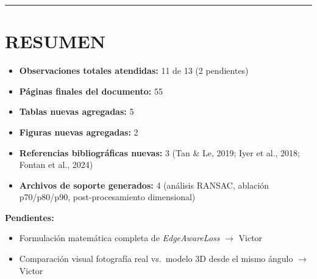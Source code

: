 \documentclass[12pt, a4paper]{article}
\begin{document}
\vspace{1em}
\hrule
\vspace{1em}


\section*{RESUMEN}

\begin{itemize}[leftmargin=*, itemsep=0.5em]
\item \textbf{Observaciones totales atendidas:} 11 de 13 (2 pendientes)
\item \textbf{Páginas finales del documento:} 55
\item \textbf{Tablas nuevas agregadas:} 5
\item \textbf{Figuras nuevas agregadas:} 2
\item \textbf{Referencias bibliográficas nuevas:} 3 (Tan \& Le, 2019; Iyer et al., 2018; Fontan et al., 2024)
\item \textbf{Archivos de soporte generados:} 4 (análisis RANSAC, ablación p70/p80/p90, post-procesamiento dimensional)
\end{itemize}

\vspace{1em}
\begin{center}
\textbf{Pendientes:}
\end{center}
\begin{itemize}[leftmargin=*, itemsep=0.5em]
\item Formulación matemática completa de \textit{EdgeAwareLoss} $\rightarrow$ Victor
\item Comparación visual fotografía real vs.\ modelo 3D desde el mismo ángulo $\rightarrow$ Victor
\end{itemize}
\end{document}
